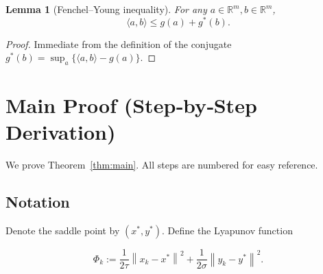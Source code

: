 \documentclass{article}
\newtheorem{lemma}{Lemma}
\newcommand{\norm}[1]{\left\|#1\right\|}
\begin{document}
\begin{lemma}[Fenchel–Young inequality]\label{lem:fy}
For any $a\in\mathbb{R}^{m},b\in\mathbb{R}^{m}$,
\[
\langle a,b\rangle\le g(a)+g^{*}(b).
\tag{5}
\]
\end{lemma}
\begin{proof}
Immediate from the definition of the conjugate $g^{*}(b)=\sup_{a}\{\langle a,b\rangle-g(a)\}$. \qedhere
\end{proof}

\section*{Main Proof (Step‑by‑Step Derivation)}
We prove Theorem~\ref{thm:main}.  
All steps are numbered for easy reference.

\subsection*{Notation}
Denote the saddle point by $(x^{*},y^{*})$.  
Define the Lyapunov function  

\[
\Phi_{k}:=
\frac{1}{2\tau}\norm{x_{k}-x^{*}}^{2}
+\frac{1}{2\sigma}\norm{y_{k}-y^{*}}^{2}.
\tag{6}
\]
\end{document}
